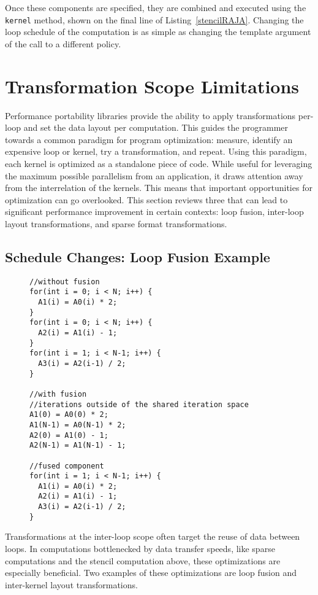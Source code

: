 Once these components are specified, they are combined and executed using the \verb.kernel. method, shown on the final line of Listing~\ref{stencilRAJA}.
Changing the loop schedule of the computation is as simple as changing the template argument of the call to a different policy.

\section{Transformation Scope Limitations}

Performance portability libraries provide the ability to apply transformations per-loop and set the data layout per computation.
This guides the programmer towards a common paradigm for program optimization: measure, identify an expensive loop or kernel, try a transformation, and repeat.
Using this paradigm, each kernel is optimized as a standalone piece of code.
While useful for leveraging the maximum possible parallelism from an application, it draws attention away from the interrelation of the kernels.
This means that important opportunities for optimization can go overlooked.
This section reviews three that can lead to significant performance improvement in certain contexts: loop fusion, inter-loop layout transformations, and sparse format transformations.

\subsection{Schedule Changes: Loop Fusion Example}
\begin{figure}
\begin{lstlisting}[caption={Three loops, with and without loop fusion.},label=fusionExample]
//without fusion
for(int i = 0; i < N; i++) {
  A1(i) = A0(i) * 2;
}
for(int i = 0; i < N; i++) {
  A2(i) = A1(i) - 1;
}
for(int i = 1; i < N-1; i++) {
  A3(i) = A2(i-1) / 2;
}

//with fusion
//iterations outside of the shared iteration space
A1(0) = A0(0) * 2;
A1(N-1) = A0(N-1) * 2;
A2(0) = A1(0) - 1;
A2(N-1) = A1(N-1) - 1;

//fused component
for(int i = 1; i < N-1; i++) {
  A1(i) = A0(i) * 2;
  A2(i) = A1(i) - 1;
  A3(i) = A2(i-1) / 2;
}
\end{lstlisting}
\end{figure}

Transformations at the inter-loop scope often target the reuse of data between loops.
In computations bottlenecked by data transfer speeds, like sparse computations and the stencil computation above, these optimizations are especially beneficial. 
Two examples of these optimizations are loop fusion and inter-kernel layout transformations.

